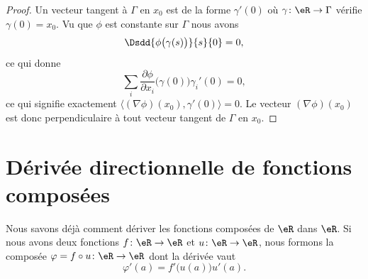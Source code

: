 \begin{proof}
    Un vecteur tangent à \( \Gamma\) en \( x_0\) est de la forme \( \gamma'(0)\) où \( \gamma\colon \eR \to \Gamma\) vérifie \( \gamma(0)=x_0\). Vu que \( \phi\) est constante sur \( \Gamma\) nous avons
    \begin{equation}
        \Dsdd{ \phi\big( \gamma(s) \big) }{s}{0}=0,
    \end{equation}
    ce qui donne
    \begin{equation}
        \sum_i\frac{ \partial \phi }{ \partial x_i }\big( \gamma(0) \big)\gamma_i'(0)=0,
    \end{equation}
    ce qui signifie exactement \( \langle (\nabla\phi)(x_0), \gamma'(0)\rangle=0\). Le vecteur \( (\nabla\phi)(x_0)\) est donc perpendiculaire à tout vecteur tangent de \( \Gamma\) en \( x_0\).
\end{proof}

\section{Dérivée directionnelle de fonctions composées}		\label{SecDerDirFnComp}

Nous savons déjà comment dériver les fonctions composées de $\eR$ dans $\eR$. Si nous avons deux fonctions $f\colon \eR\to \eR$ et $u\colon \eR\to \eR$, nous formons la composée $\varphi=f\circ u\colon \eR\to \eR$ dont la dérivée vaut
\begin{equation}
	\varphi'(a)=f'\big( u(a) \big)u'(a).
\end{equation}

